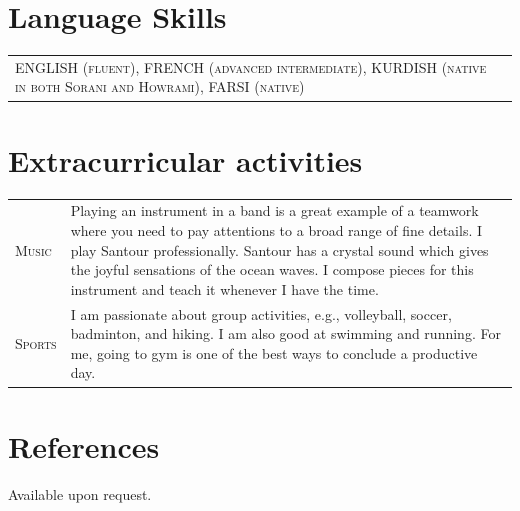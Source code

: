 \documentclass[10PT,letter]{article}
\newcommand{\numbox}[1]{} %
\begin{document}
\section*{\numbox{9}\bfseries\textcolor{titlecol}{\sffamily Language Skills}}

	\begin{tabular}{p{7.2in}p{5.55in}}
		\textsc{ENGLISH (fluent),   FRENCH (advanced intermediate),  KURDISH (native in both Sorani and Howrami), FARSI (native)} & \\[.5mm]
	\end{tabular}

\section*{\numbox{9}\bfseries\textcolor{titlecol}{\sffamily Extracurricular activities}}

	\begin{tabular}{p{1.2in}p{5.55in}}
		\textsc{Music} & Playing an instrument in a band is a great example of a teamwork where you need to pay attentions to a broad range of fine details.   I play Santour professionally. Santour has a crystal sound which gives the joyful sensations of  the ocean waves.  I compose pieces for this instrument and teach it whenever I have the time. \\[.5mm]
		\textsc{Sports} & I am passionate about group activities, e.g., volleyball, soccer, badminton, and hiking. I am also good at swimming and running. For me, going to gym is one of the best ways to conclude a productive day. \\[.5mm]
	\end{tabular}
\section*{\numbox{9}\bfseries\textcolor{titlecol}{\sffamily References}}
Available upon request. 
\end{document}
